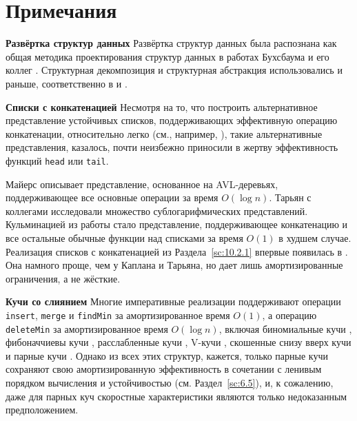 \section{Примечания}
\label{sc:10.4}

\noindent
\textbf{Развёртка структур данных} Развёртка структур данных была
распознана как общая методика проектирования структур данных в
работах Бухсбаума и его коллег \cite{Buchsbaum1993,
  BuchsbaumTarjan1995, BuchsbaumSundarTarjan1995}. Структурная
декомпозиция и структурная абстракция использовались и раньше,
соответственно в \cite{Dietz1982} и \cite{DriscollSleatorTarjan1994}.

\noindent
\textbf{Списки с конкатенацией} Несмотря на то, что построить
альтернативное представление устойчивых списков, поддерживающих
эффективную операцию конкатенации, относительно легко (см., например,
\cite{Hughes1986}), такие альтернативные представления, казалось,
почти неизбежно приносили в жертву эффективность функций
\lstinline!head! или \lstinline!tail!.

Майерс \cite{Myers1982} описывает представление, основанное на
AVL-деревьях, поддерживающее все основные операции за время $O(\log
n)$. Тарьян с коллегами \cite{DriscollSleatorTarjan1994,
  BuchsbaumTarjan1995, KaplanTarjan1995} исследовали множество
сублогарифмических представлений. Кульминацией из работы стало
представление, поддерживающее конкатенацию и все остальные обычные
функции над списками за время $O(1)$ в худшем случае. Реализация
списков с конкатенацией из Раздела~\ref{sc:10.2.1} впервые появилась в
\cite{Okasaki1995a}. Она намного проще, чем у Каплана и Тарьяна, но
дает лишь амортизированные ограничения, а не жёсткие.

\noindent
\textbf{Кучи со слиянием} Многие императивные реализации поддерживают
операции \lstinline!insert!, \lstinline!merge! и \lstinline!findMin!
за амортизированное время $O(1)$, а операцию \lstinline!deleteMin! за
амортизированное время $O(\log n)$, включая биномиальные кучи
\cite{KhoongLeong1993}, фибоначчиевы кучи \cite{FredmanTarjan1987},
расслабленные кучи \cite{Driscoll-etal1988}, V-кучи
\cite{Peterson1987}, скошенные снизу вверх кучи
\cite{SleatorTarjan1986b} и парные кучи
\cite{Fredman-etal1986}. Однако из всех этих структур, кажется, только
парные кучи сохраняют свою амортизированную эффективность в сочетании
с ленивым порядком вычисления и устойчивостью
(см. Раздел~\ref{sc:6.5}), и, к сожалению, даже для парных куч
скоростные характеристики являются только недоказанным предположением.

